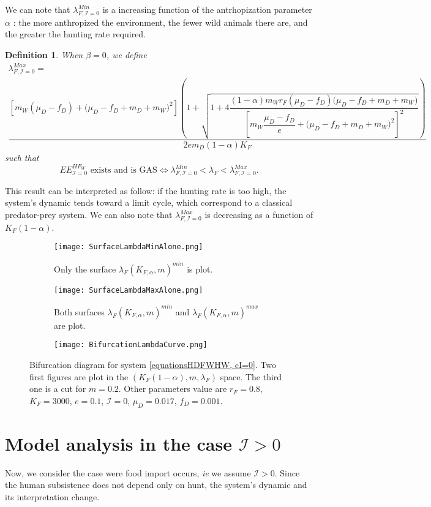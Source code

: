 \documentclass{article}
\newcommand{\lfw}{\lambda_{F}}
\newcommand{\lfw}{\lambda_{F}}
\newcommand{\Kfa}{K_{F,\alpha}}
\newcommand{\cI}{\mathcal{I}}
\newtheorem{definition}{Definition}
\begin{document}
We can note that $\lambda_{F, \cI=0}^{Min}$ is a increasing function of the antrhopization parameter $\alpha$ : the more anthropized the environment, the fewer wild animals there are, and the greater the hunting rate required. 

\begin{definition}
When $\beta = 0 $, we define
\begin{multline*}
\lambda_{F, \cI =0}^{Max}  = \\
\dfrac{\left[m_{W}(\mu_{D}-f_{D})+\big(\mu_{D}-f_{D}+m_{D}+m_{W})^{2}\right]\left(1+\sqrt{1+4\dfrac{(1-\alpha)m_{W}r_{F}\left(\mu_{D}-f_{D}\right)\big(\mu_{D}-f_{D}+m_{D}+m_{W})}{\left[m_{W}\dfrac{\mu_{D}-f_{D}}{e}+\big(\mu_{D}-f_{D}+m_{D}+m_{W})^{2}\right]^{2}}}\right)}{2em_D (1-\alpha) K_F }
\end{multline*}
such that $$
\text{$EE^{HF_W}_{\cI = 0}$ exists and is GAS} \Leftrightarrow \lambda_{F, \cI=0}^{Min} < \lfw < \lambda_{F, \cI =0}^{Max}
.$$
\end{definition}

This result can be interpreted as follow: if the hunting rate is too high, the system's dynamic tends toward a limit cycle, which correspond to a classical predator-prey system. We can also note that $\lambda_{F, \cI =0}^{Max} $ is decreasing as a function of $K_F(1-\alpha)$. 

\begin{figure}
\centering
\begin{subfigure}{0.49\textwidth}
\centering
\texttt{[image: SurfaceLambdaMinAlone.png]}
\caption{Only the surface $\lfw(\Kfa, m)^{min}$ is plot.}
\end{subfigure}
\begin{subfigure}{0.49\textwidth}
\centering
\texttt{[image: SurfaceLambdaMaxAlone.png]}
\caption{Both surfaces $\lfw(\Kfa, m)^{min}$ and $\lfw(\Kfa, m)^{max}$ are plot.}
\end{subfigure}
\hfill
\begin{subfigure}{\textwidth}
\texttt{[image: BifurcationLambdaCurve.png]}
\caption{}
\end{subfigure}
\caption{\centering Bifurcation diagram for system \eqref{equationsHDFWHW, cI=0}. Two first figures are plot in the $(K_F(1-\alpha), m, \lfw)$ space. The third one is a cut for $m=0.2$. Other parameters value are $r_F = 0.8$, $K_F=3000$, $e=0.1$, $\cI=0$, $\mu_D = 0.017$, $f_D = 0.001$.}
\end{figure}


\section{Model analysis in the case $\cI > 0$}
Now, we consider the case were food import occurs, \textit{ie} we assume $\cI > 0$. Since the human subsistence does not depend only on hunt, the system's dynamic and its interpretation change.
\end{document}
